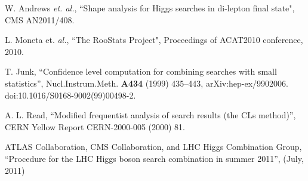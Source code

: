 
W. Andrews {\it et. al.}, ``Shape analysis for Higgs searches in di-lepton final state", 
CMS AN2011/408.


L. Moneta et. {\it al.}, ``The RooStats Project", Proceedings of ACAT2010 conference, 2010.

T. Junk, ``Confidence level computation for combining searches with small statistics'', 
Nucl.Instrum.Meth. {\bf A434} (1999) 435–443, arXiv:hep-ex/9902006. 
doi:10.1016/S0168-9002(99)00498-2.

A. L. Read, ``Modified frequentist analysis of search results (the CLs method)'', 
CERN Yellow Report CERN-2000-005 (2000) 81.

ATLAS Collaboration, CMS Collaboration, and LHC Higgs Combination Group, 
``Procedure for the LHC Higgs boson search combination in summer 2011'', (July, 2011)

